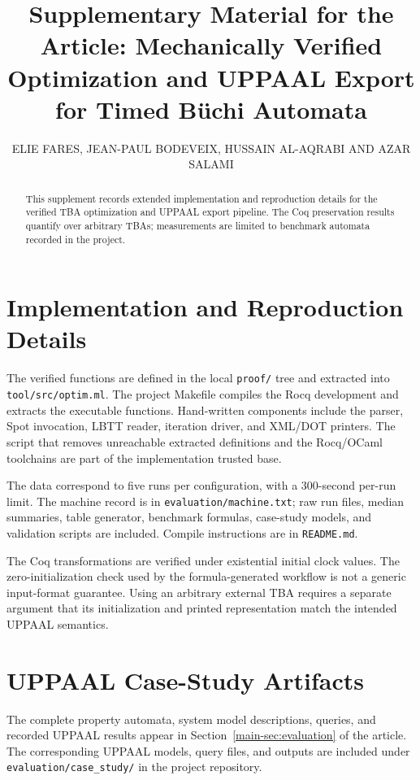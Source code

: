 \documentclass{ieeeaccess}
\begin{document}
\history{}
\doi{}
\title{Supplementary Material for the Article: Mechanically Verified Optimization and UPPAAL Export for Timed B\"uchi Automata}
\author{\uppercase{Elie Fares},
\uppercase{Jean-Paul Bodeveix},
\uppercase{Hussain Al-Aqrabi} AND
\uppercase{Azar Salami}}
\address[1]{Higher Colleges of Technology, Sharjah, United Arab Emirates (e-mail: efares@hct.ac.ae, halaqrabi@hct.ac.ae, asalami@hct.ac.ae)}
\address[2]{IRIT, UPS, Universit\'e de Toulouse, France (e-mail: bodeveix@irit.fr)}
\begin{abstract}
This supplement records extended implementation and reproduction details for the verified TBA optimization and UPPAAL export pipeline. The Coq preservation results quantify over arbitrary TBAs; measurements are limited to benchmark automata recorded in the project.
\end{abstract}
\titlepgskip=-15pt
\maketitle


\section{Implementation and Reproduction Details}
\label{sec:supp-implementation}
The verified functions are defined in the local \texttt{proof/} tree and extracted into \texttt{tool/src/optim.ml}. The project Makefile compiles the Rocq development and extracts the executable functions. Hand-written components include the parser, Spot invocation, LBTT reader, iteration driver, and XML/DOT printers. The script that removes unreachable extracted definitions and the Rocq/OCaml toolchains are part of the implementation trusted base.

The data correspond to five runs per configuration, with a 300-second per-run limit. The machine record is in \texttt{evaluation/machine.txt}; raw run files, median summaries, table generator, benchmark formulas, case-study models, and validation scripts are included. Compile instructions are in \texttt{README.md}.

The Coq transformations are verified under existential initial clock values. The zero-initialization check used by the formula-generated workflow is not a generic input-format guarantee. Using an arbitrary external TBA requires a separate argument that its initialization and printed representation match the intended UPPAAL semantics.

\section{UPPAAL Case-Study Artifacts}
The complete property automata, system model descriptions, queries, and recorded UPPAAL results appear in Section~\ref{main-sec:evaluation} of the article. The corresponding UPPAAL models, query files, and outputs are included under \texttt{evaluation/case\_study/} in the project repository.

\EOD
\end{document}
